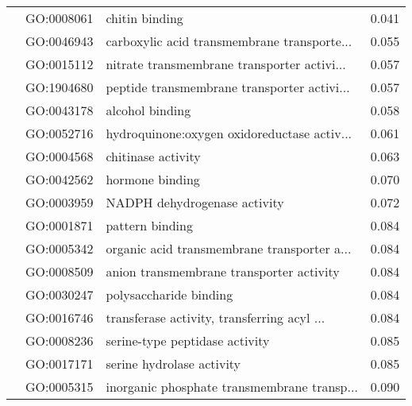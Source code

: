 \begin{longtable}{lllr}
   & GO:0008061 &                               chitin binding &         0.041 \\
   & GO:0046943 &  carboxylic acid transmembrane transporte... &         0.055 \\
   & GO:0015112 &  nitrate transmembrane transporter activi... &         0.057 \\
   & GO:1904680 &  peptide transmembrane transporter activi... &         0.057 \\
   & GO:0043178 &                              alcohol binding &         0.058 \\
   & GO:0052716 &  hydroquinone:oxygen oxidoreductase activ... &         0.061 \\
   & GO:0004568 &                           chitinase activity &         0.063 \\
   & GO:0042562 &                              hormone binding &         0.070 \\
   & GO:0003959 &                 NADPH dehydrogenase activity &         0.072 \\
   & GO:0001871 &                              pattern binding &         0.084 \\
   & GO:0005342 &  organic acid transmembrane transporter a... &         0.084 \\
   & GO:0008509 &     anion transmembrane transporter activity &         0.084 \\
   & GO:0030247 &                       polysaccharide binding &         0.084 \\
   & GO:0016746 &  transferase activity, transferring acyl ... &         0.084 \\
   & GO:0008236 &               serine-type peptidase activity &         0.085 \\
   & GO:0017171 &                    serine hydrolase activity &         0.085 \\
   & GO:0005315 &  inorganic phosphate transmembrane transp... &         0.090 \\
\end{longtable}
